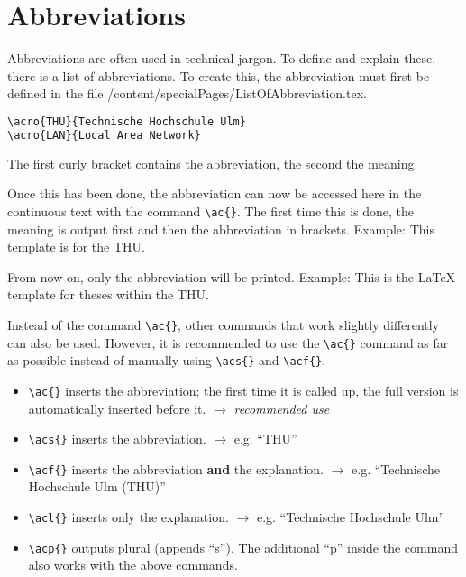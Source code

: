 \section{Abbreviations}
Abbreviations are often used in technical jargon. To define and explain these, there is a list of abbreviations. To create this, the abbreviation must first be defined in the file /content/specialPages/ListOfAbbreviation.tex.

\begin{lstlisting}[caption=Example of an akromym definition, label=lst:acronym_def_en, language=bash]
\acro{THU}{Technische Hochschule Ulm}
\acro{LAN}{Local Area Network}
\end{lstlisting}

The first curly bracket contains the abbreviation, the second the meaning.

Once this has been done, the abbreviation can now be accessed here in the continuous text with the command \texttt{\textbackslash{}ac\{\}}. The first time this is done, the meaning is output first and then the abbreviation in brackets. Example: This template is for the \ac{THU}.

From now on, only the abbreviation will be printed. Example: This is the LaTeX template for theses within the \ac{THU}.

Instead of the command \texttt{\textbackslash{}ac\{\}}, other commands that work slightly differently can also be used. However, it is recommended to use the \texttt{\textbackslash{}ac\{\}} command as far as possible instead of manually using \texttt{\textbackslash{}acs\{\}} and \texttt{\textbackslash{}acf\{\}}.

\begin{itemize}
    \item \texttt{\textbackslash{}ac\{\}} inserts the abbreviation; the first time it is called up, the full version is automatically inserted before it. $\rightarrow$ \textit{recommended use}
    \item \texttt{\textbackslash{}acs\{\}} inserts the abbreviation. $\rightarrow$ e.g. \enquote{THU}
    \item \texttt{\textbackslash{}acf\{\}} inserts the abbreviation \textbf{and} the explanation. $\rightarrow$ e.g. \enquote{Technische Hochschule Ulm (THU)}
    \item \texttt{\textbackslash{}acl\{\}} inserts only the explanation. $\rightarrow$ e.g. \enquote{Technische Hochschule Ulm}
    \item \texttt{\textbackslash{}acp\{\}} outputs plural (appends \enquote{s}). The additional \enquote{p} inside the command also works with the above commands.
\end{itemize}


